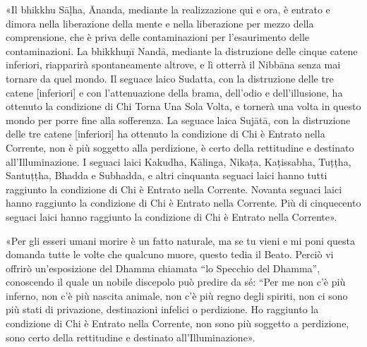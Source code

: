 «Il bhikkhu Sāḷha, Ānanda, mediante la realizzazione qui e ora, è entrato e
dimora nella liberazione della mente e nella liberazione per mezzo della
comprensione, che è priva delle contaminazioni per l’esaurimento delle
contaminazioni. La bhikkhuṇī Nandā, mediante la distruzione delle cinque catene
inferiori, riapparirà spontaneamente altrove, e lì otterrà il Nibbāna senza mai
tornare da quel mondo. Il seguace laico Sudatta, con la distruzione delle tre
catene [inferiori] e con l’attenuazione della brama, dell’odio e dell’illusione,
ha ottenuto la condizione di Chi Torna Una Sola Volta, e tornerà una volta in
questo mondo per porre fine alla sofferenza. La seguace laica Sujātā, con la
distruzione delle tre catene [inferiori] ha ottenuto la condizione di Chi è
Entrato nella Corrente, non è più soggetto alla perdizione, è certo della
rettitudine e destinato all’Illuminazione. I seguaci laici Kakudha, Kālinga,
Nikaṭa, Kaṭissabha, Tuṭṭha, Santuṭṭha, Bhadda e Subhadda, e altri cinquanta
seguaci laici hanno tutti raggiunto la condizione di Chi è Entrato nella
Corrente. Novanta seguaci laici hanno raggiunto la condizione di Chi è Entrato
nella Corrente. Più di cinquecento seguaci laici hanno raggiunto la condizione
di Chi è Entrato nella Corrente».

«Per gli esseri umani morire è un fatto naturale, ma se tu vieni e mi poni
questa domanda tutte le volte che qualcuno muore, questo tedia il Beato. Perciò
vi offrirò un’esposizione del Dhamma chiamata “lo Specchio del Dhamma”,
conoscendo il quale un nobile discepolo può predire da sé: “Per me non c’è più
inferno, non c’è più nascita animale, non c’è più regno degli spiriti, non ci
sono più stati di privazione, destinazioni infelici o perdizione. Ho raggiunto
la condizione di Chi è Entrato nella Corrente, non sono più soggetto a
perdizione, sono certo della rettitudine e destinato all’Illuminazione».

